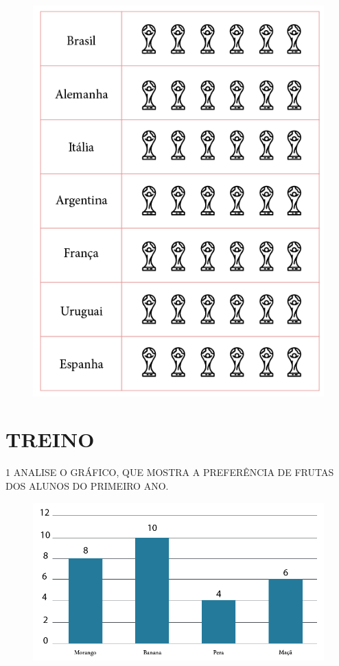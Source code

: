 \pagebreak

\vspace{1cm}

\begin{figure}[H]
\centering
\includegraphics[width=\textwidth]{./media/SAEB_1ANO_MAT_FIGURA108.png}
\end{figure}

\section*{TREINO}

\num{1} ANALISE O GRÁFICO, QUE MOSTRA A PREFERÊNCIA DE FRUTAS DOS ALUNOS DO PRIMEIRO ANO.

\begin{figure}[htpb!]
\centering
\includegraphics[width=.6\textwidth]{./media/SAEB_1ANO_MAT_FIGURA109.png}
\end{figure}

